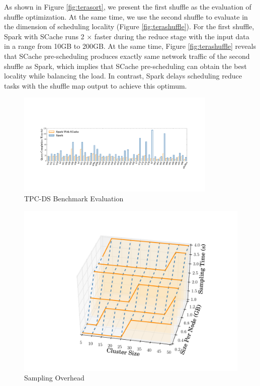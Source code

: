 As shown in Figure \ref{fig:terasort}, we present the first shuffle as the evaluation of shuffle optimization. At the same time, we use the second shuffle to evaluate in the dimension of scheduling locality (Figure \ref{fig:terashuffle}). For the first shuffle, Spark with SCache runs 2 $\times$ faster during the reduce stage with the input data in a range from 10GB to 200GB. At the same time, Figure \ref{fig:terashuffle} reveals that SCache pre-scheduling produces exactly same network traffic of the second shuffle as Spark, which implies that SCache pre-scheduling can obtain the best locality while balancing the load. In contrast, Spark delays scheduling reduce tasks with the shuffle map output to achieve this optimum.

\begin{figure}
	\includegraphics[width=0.85\textwidth]{fig/tpcds}
	\caption{TPC-DS Benchmark Evaluation}
	\label{fig:tpcds}
	\vspace{-1em}
\end{figure}
\begin{figure}
	\centering
	\includegraphics[width=0.6\linewidth]{fig/sampling}
	\caption{Sampling Overhead}
	\label{fig:sampling}
	\vspace{-1em}
\end{figure}

